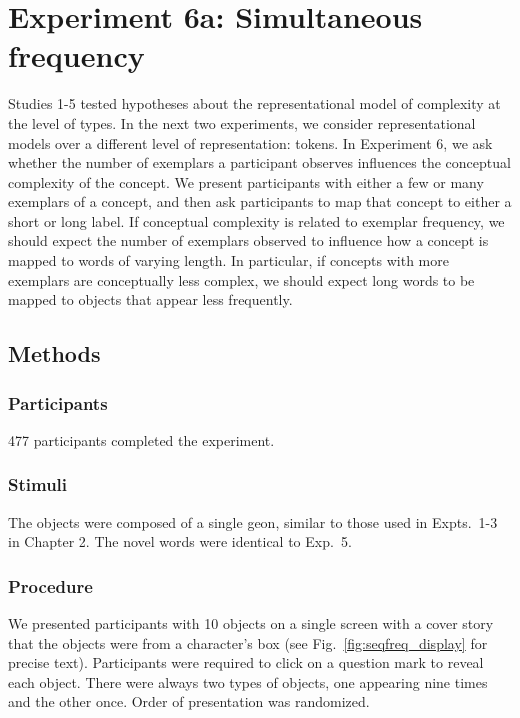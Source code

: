 \section{Experiment 6a: Simultaneous frequency}
Studies 1-5  tested hypotheses about the representational model of complexity at the level of types. In the next two experiments, we  consider representational models over a different level of representation: tokens. In Experiment 6, we ask whether the number of exemplars a participant observes influences the conceptual complexity of the concept. We present participants with either a few or many exemplars of a concept, and then ask participants to map that concept to either a short or long label. If conceptual complexity is related to exemplar frequency, we should expect the number of exemplars observed to influence how a concept is mapped to words of varying length. In particular, if concepts with more exemplars are conceptually less complex, we should expect long words to be mapped to objects that appear less frequently.

\subsection{Methods}
\subsubsection{Participants}
477 participants completed the experiment.
\subsubsection{Stimuli}
The objects were composed of a single geon, similar to those used in Expts.\ 1-3 in Chapter 2. The novel words were identical to Exp.\ 5.
\subsubsection{Procedure}
We presented participants with 10 objects on a single screen with a cover story that the objects were from a character's box (see Fig.\ \ref{fig:seqfreq_display} for precise text). Participants were required to click on a question mark to reveal each object. There were always two types of objects, one appearing nine times and the other once. Order of presentation was randomized.

